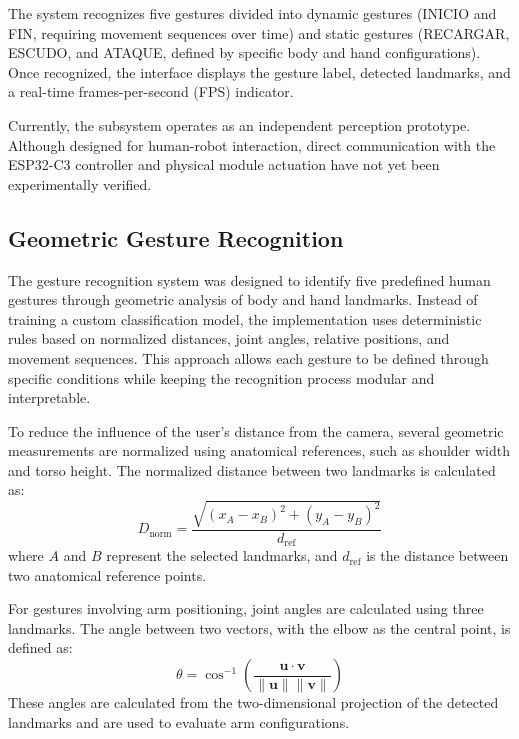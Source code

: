\documentclass[lettersize,journal]{IEEEtran}
\begin{document}
	The system recognizes five gestures divided into dynamic gestures (INICIO and FIN, requiring movement sequences over time) and static gestures (RECARGAR, ESCUDO, and ATAQUE, defined by specific body and hand configurations). Once recognized, the interface displays the gesture label, detected landmarks, and a real-time frames-per-second (FPS) indicator.
	
	Currently, the subsystem operates as an independent perception prototype. Although designed for human-robot interaction, direct communication with the ESP32-C3 controller and physical module actuation have not yet been experimentally verified.
	
	\subsection{Geometric Gesture Recognition}
	
	The gesture recognition system was designed to identify five predefined human gestures through geometric analysis of body and hand landmarks. Instead of training a custom classification model, the implementation uses deterministic rules based on normalized distances, joint angles, relative positions, and movement sequences. This approach allows each gesture to be defined through specific conditions while keeping the recognition process modular and interpretable.
	
	To reduce the influence of the user's distance from the camera, several geometric measurements are normalized using anatomical references, such as shoulder width and torso height. The normalized distance between two landmarks is calculated as:
	\begin{equation}
		D_{\text{norm}} = \frac{\sqrt{(x_A - x_B)^2 + (y_A - y_B)^2}}{d_{\text{ref}}}
	\end{equation}
	where $A$ and $B$ represent the selected landmarks, and $d_{\text{ref}}$ is the distance between two anatomical reference points.
	
	For gestures involving arm positioning, joint angles are calculated using three landmarks. The angle between two vectors, with the elbow as the central point, is defined as:
	\begin{equation}
		\theta = \cos^{-1}\left( \frac{\mathbf{u} \cdot \mathbf{v}}{\|\mathbf{u}\| \|\mathbf{v}\|} \right)
	\end{equation}
	These angles are calculated from the two-dimensional projection of the detected landmarks and are used to evaluate arm configurations.
	
\end{document}
